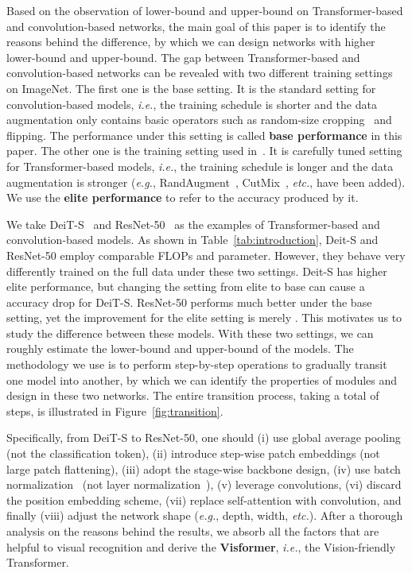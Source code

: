 \documentclass[10pt,twocolumn,letterpaper]{article}
\begin{document}
Based on the observation of lower-bound and upper-bound on Transformer-based and convolution-based networks, the main goal of this paper is to identify the reasons behind the difference, by which we can design networks with higher lower-bound and upper-bound. The gap between Transformer-based and convolution-based networks can be revealed with two different training settings on ImageNet. The first one is the base setting. It is the standard setting for convolution-based models, \textit{i.e.}, the training schedule is shorter and the data augmentation only contains basic operators such as random-size cropping~\cite{szegedy2016rethinking} and flipping. The performance under this setting is called \textbf{base performance} in this paper. The other one is the training setting used in~\cite{touvron2020training}. It is carefully tuned setting for Transformer-based models, \textit{i.e.}, the training schedule is longer and the data augmentation is stronger (\textit{e.g.}, RandAugment~\cite{cubuk2020randaugment}, CutMix~\cite{yun2019cutmix}, \textit{etc.}, have been added). We use the \textbf{elite performance} to refer to the accuracy produced by it.





We take DeiT-S~\cite{touvron2020training} and ResNet-50~\cite{he2016deep} as the examples of Transformer-based and convolution-based models. As shown in Table~\ref{tab:introduction}, Deit-S and ResNet-50 employ comparable FLOPs and parameter. However, they behave very differently trained on the full data under these two settings. Deit-S has higher elite performance, but changing the setting from elite to base can cause a  accuracy drop for DeiT-S. ResNet-50 performs much better under the base setting, yet the improvement for the elite setting is merely . This motivates us to study the difference between these models. With these two settings, we can roughly estimate the lower-bound and upper-bound of the models. The methodology we use is to perform step-by-step operations to gradually transit one model into another, by which we can identify the properties of modules and design in these two networks. The entire transition process, taking a total of  steps, is illustrated in Figure~\ref{fig:transition}.



Specifically, from DeiT-S to ResNet-50, one should (i) use global average pooling (not the classification token), (ii) introduce step-wise patch embeddings (not large patch flattening), (iii) adopt the stage-wise backbone design, (iv) use batch normalization~\cite{ioffe2015batch} (not layer normalization~\cite{ba2016layer}), (v) leverage  convolutions, (vi) discard the position embedding scheme, (vii) replace self-attention with convolution, and finally (viii) adjust the network shape (\textit{e.g.}, depth, width, \textit{etc.}). After a thorough analysis on the reasons behind the results, we absorb all the factors that are helpful to visual recognition and derive the \textbf{Visformer}, \textit{i.e.}, the Vision-friendly Transformer.
\end{document}
